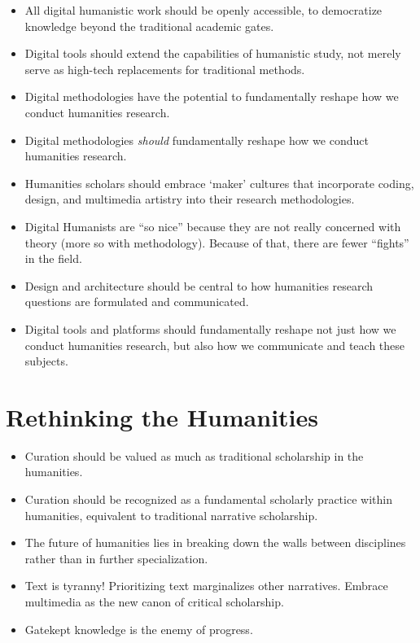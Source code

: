 \documentclass{article}
\begin{document}
\begin{itemize}

    \item All digital humanistic work should be openly accessible, to democratize knowledge beyond the traditional academic gates.

    \item Digital tools should extend the capabilities of humanistic study, not merely serve as high-tech replacements for traditional methods.

    \item Digital methodologies have the potential to fundamentally reshape how we conduct humanities research.

    \item Digital methodologies \textit{should} fundamentally reshape how we conduct humanities research.

    \item Humanities scholars should embrace `maker' cultures that incorporate coding, design, and multimedia artistry into their research methodologies.

    \item Digital Humanists are ``so nice'' because they are not really concerned with theory (more so with methodology). Because of that, there are fewer ``fights'' in the field.
        
    \item Design and architecture should be central to how humanities research questions are formulated and communicated.
    
    \item Digital tools and platforms should fundamentally reshape not just how we conduct humanities research, but also how we communicate and teach these subjects.
    
\end{itemize}

\section*{Rethinking the Humanities}

\begin{itemize}

\item Curation should be valued as much as traditional scholarship in the humanities.

\item Curation should be recognized as a fundamental scholarly practice within humanities, equivalent to traditional narrative scholarship.

\item The future of humanities lies in breaking down the walls between disciplines rather than in further specialization.

\item Text is tyranny! Prioritizing text marginalizes other narratives. Embrace multimedia as the new canon of critical scholarship.

\item Gatekept knowledge is the enemy of progress.

\end{itemize}
\end{document}
